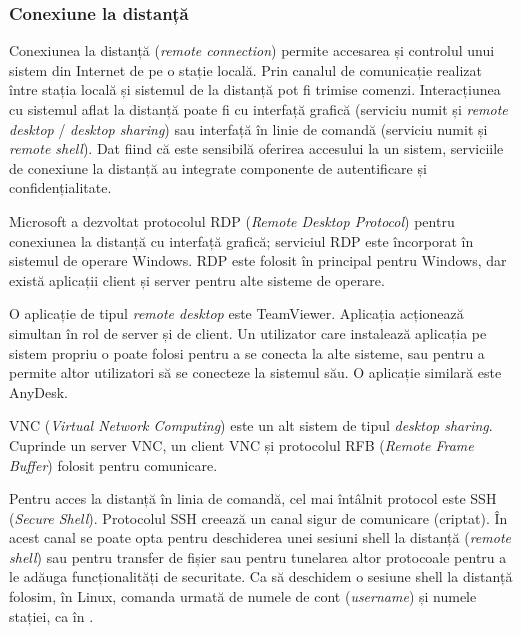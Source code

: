 \subsubsection{Conexiune la distanță}
\label{sec:net:apps:other:remote}

Conexiunea la distanță (\textit{remote connection}) permite accesarea și controlul unui sistem din Internet de pe o stație locală.
Prin canalul de comunicație realizat între stația locală și sistemul de la distanță pot fi trimise comenzi.
Interacțiunea cu sistemul aflat la distanță poate fi cu interfață grafică (serviciu numit și \textit{remote desktop} / \textit{desktop sharing}) sau interfață în linie de comandă (serviciu numit și \textit{remote shell}).
Dat fiind că este sensibilă oferirea accesului la un sistem, serviciile de conexiune la distanță au integrate componente de autentificare și confidențialitate.

Microsoft a dezvoltat protocolul RDP (\textit{Remote Desktop Protocol}) pentru conexiunea la distanță cu interfață grafică;
serviciul RDP este încorporat în sistemul de operare Windows.
RDP este folosit în principal pentru Windows, dar există aplicații client și server pentru alte sisteme de operare.

O aplicație de tipul \textit{remote desktop} este TeamViewer.
Aplicația acționează simultan în rol de server și de client.
Un utilizator care instalează aplicația pe sistem propriu o poate folosi pentru a se conecta la alte sisteme, sau pentru a permite altor utilizatori să se conecteze la sistemul său.
O aplicație similară este AnyDesk.

VNC (\textit{Virtual Network Computing}) este un alt sistem de tipul \textit{desktop sharing}.
Cuprinde un server VNC, un client VNC și protocolul RFB (\textit{Remote Frame Buffer}) folosit pentru comunicare.

Pentru acces la distanță în linia de comandă, cel mai întâlnit protocol este SSH (\textit{Secure Shell}).
Protocolul SSH creează un canal sigur de comunicare (criptat).
În acest canal se poate opta pentru deschiderea unei sesiuni shell la distanță (\textit{remote shell}) sau pentru transfer de fișier sau pentru tunelarea altor protocoale pentru a le adăuga funcționalități de securitate.
Ca să deschidem o sesiune shell la distanță folosim, în Linux, comanda  urmată de numele de cont (\textit{username}) și numele stației, ca în .


